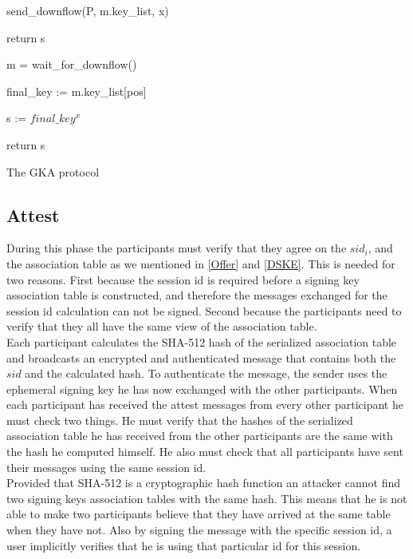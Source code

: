 \documentclass[12pt,titlepage,a4paper]{article}
\begin{document}
{\begin{algorithm}[H]
{{{				send\_downflow(P, m.key\_list, x)

				return s
			}
	}

	m = wait\_for\_downflow()


	final\_key := m.key\_list[pos]

	s := $final\_key^x$

	return s

	}
	\caption{The GKA protocol}
	\label{gka_proto_algo}
\end{algorithm}

\clearpage
\subsection{Attest}

During this phase the participants must verify that they agree on the $sid_i$,
and the association table as we mentioned in \ref{Offer} and \ref{DSKE}.
This is needed for two reasons. First because the session id is required before a signing key association table is constructed, and therefore the messages exchanged for the session id calculation can not be signed.
Second because the participants need to verify that they all have the same view of the association table.\\

Each participant calculates the SHA-512 hash of the serialized association table and broadcasts an encrypted and authenticated message that contains both the $sid$ and the calculated hash.
To authenticate the message, the sender uses the ephemeral signing key he has now exchanged with the other participants.
When each participant has received the attest messages from every other participant he must check two things.
He must verify that the hashes of the serialized association table he has received from the other participants are the same with the hash he computed himself.
He also must check that all participants have sent their messages using the same session id.\\

Provided that SHA-512 is a cryptographic hash function an attacker cannot find two signing keys association tables with the same hash.
This means that he is not able to make two participants believe that they have arrived at the same table when they have not.
Also by signing the message with the specific session id, a user implicitly verifies that he is using that particular id for this session.

}
\end{document}

